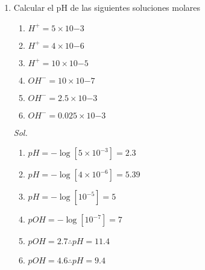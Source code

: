 \begin{enumerate}

	\item Calcular el pH de las siguientes soluciones molares

	      \begin{enumerate}
		      \item $H^+=5\times10{-3}$
		      \item $H^+=4\times10{-6}$
		      \item $H^+=10\times10{-5}$
		      \item $OH^-=10\times10{-7}$
		      \item $OH^-=2.5\times10{-3}$
		      \item $OH^-=0.025\times10{-3}$
	      \end{enumerate}


	      \textit{ Sol. }


	      \begin{enumerate}
		      \item $pH=-\log[5\times 10^{-3}]=2.3$
		      \item $pH=-\log[4\times10^{-6}]=5.39$
		      \item $pH=-\log[10^{-5}]=5$
		      \item $pOH=-\log[10^{-7}]=7$
		      \item $pOH=2.7\therefore pH=11.4$
		      \item $pOH=4.6\therefore pH=9.4$
	      \end{enumerate}


\end{enumerate}
